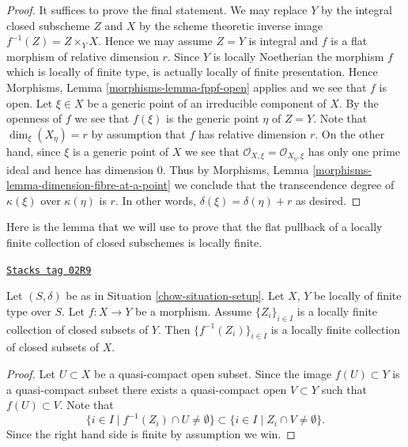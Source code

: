 \begin{proof}
It suffices to prove the final statement.
We may replace $Y$ by the integral closed subscheme $Z$ and
$X$ by the scheme theoretic inverse image $f^{-1}(Z) = Z \times_Y X$.
Hence we may assume $Z = Y$ is integral and $f$ is a flat morphism
of relative dimension $r$. Since $Y$ is locally Noetherian the
morphism $f$ which is locally of finite type,
is actually locally of finite presentation. Hence
Morphisms, Lemma \ref{morphisms-lemma-fppf-open}
applies and we see that $f$ is open.
Let $\xi \in X$ be a generic point of an irreducible component
of $X$. By the openness of $f$ we see that $f(\xi)$ is the
generic point $\eta$ of $Z = Y$. Note that $\dim_\xi(X_\eta) = r$
by assumption that $f$ has relative dimension $r$. On the other
hand, since $\xi$ is a generic point of $X$ we see that
$\mathcal{O}_{X, \xi} = \mathcal{O}_{X_\eta, \xi}$ has only one
prime ideal and hence has dimension $0$. Thus by
Morphisms, Lemma \ref{morphisms-lemma-dimension-fibre-at-a-point}
we conclude that the transcendence
degree of $\kappa(\xi)$ over $\kappa(\eta)$ is $r$.
In other words, $\delta(\xi) = \delta(\eta) + r$ as desired.
\end{proof}

Here is the lemma that we will use to prove that the flat pullback
of a locally finite collection of closed subschemes is locally finite.

\begin{lemma}
\label{chow-lemma-inverse-image-locally-finite}
\href{https://stacks.math.columbia.edu/tag/02R9}{\texttt{Stacks tag 02R9}}

Let $(S, \delta)$ be as in Situation \ref{chow-situation-setup}.
Let $X$, $Y$ be locally of finite type over $S$.
Let $f : X \to Y$ be a morphism.
Assume $\{Z_i\}_{i \in I}$ is a locally
finite collection of closed subsets of $Y$.
Then $\{f^{-1}(Z_i)\}_{i \in I}$ is a locally finite
collection of closed subsets of $X$.
\end{lemma}

\begin{proof}
Let $U \subset X$ be a quasi-compact open subset.
Since the image $f(U) \subset Y$ is a quasi-compact subset
there exists a quasi-compact open $V \subset Y$ such that
$f(U) \subset V$. Note that
$$
\{i \in I \mid f^{-1}(Z_i) \cap U \not = \emptyset \}
\subset
\{i \in I \mid Z_i \cap V \not = \emptyset \}.
$$
Since the right hand side is finite by assumption we win.
\end{proof}


